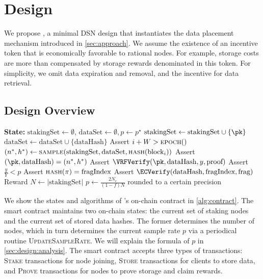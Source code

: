 \section{Design}
\label{sec:design}

We propose \sys, a minimal DSN design that instantiates the data placement mechanism introduced in \cref{sec:approach}.
We assume the existence of an incentive token that is economically favorable to rational nodes.
For example, storage costs are more than compensated by storage rewards denominated in this token.
For simplicity, we omit data expiration and removal, and the incentive for data retrieval.

\subsection{Design Overview}

\begin{algorithm}
\caption{On-chain smart contracts.
\textsc{epoch()} returns current block height, and block$_i$ is the block at height $i$.
\textsc{Stake} and \textsc{Store} transactions are presented with simplification.}
\label{alg:contract}
\begin{algorithmic}[1]
\State \textbf{State:} $\text{stakingSet} \gets \emptyset$, $\text{dataSet} \gets \emptyset, p \gets p^\star$
    \State $\text{stakingSet} \gets \text{stakingSet} \cup \{\pk\}$
\EndProcedure
{}
    \State $\text{dataSet} \gets \text{dataSet} \cup \{\text{dataHash}\}$
\EndProcedure
{}
    \State Assert $i+W>\textsc{epoch}()$
    \State $(n^*, h^*) \gets \textsc{sample}(\text{stakingSet}, \text{dataSet}, \textsc{hash}({\text{block}_i}))$
    \State Assert $(\pk, \text{dataHash}) = (n^*, h^*)$
    \State Assert $\VRFVerify(\pk, \text{dataHash}, y, \text{proof})$
    \State Assert $\frac{y}{Y}<p$
    \State Assert $\textsc{hash}(\pi) = \text{fragIndex}$
    \State Assert $\ECVerify(\text{dataHash}, \text{fragIndex}, \text{frag})$
    \State Reward \pk
\EndProcedure
{}
    \State $N \gets \left|\text{stakingSet}\right|$
    \State $p \gets \frac{2N_e}{(1-f)N}$ rounded to a certain precision
\EndProcedure
\end{algorithmic}
\end{algorithm}

We show the states and algorithms of \sys's on-chain contract in \cref{alg:contract}.
The smart contract maintains two on-chain states: the current set of staking nodes and the current set of stored data hashes.
The former determines the number of nodes, which in turn determines the current sample rate $p$ via a periodical routine \textsc{UpdateSampleRate}.
We will explain the formula of $p$ in \cref{sec:design:analysis}.
The smart contract accepts three types of transactions: \textsc{Stake} transactions for node joining, \textsc{Store} transactions for clients to store data, and \textsc{Prove} transactions for nodes to prove storage and claim rewards.

